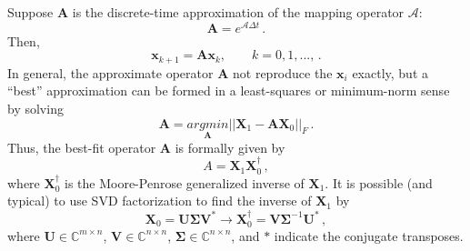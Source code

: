 Suppose $\mathbf{A}$ is the discrete-time approximation of the mapping operator $\mathcal{A}$:
\begin{equation}
\label{eq:A}
\mathbf{A} = e^{\mathcal{A} \Delta t} \, .
\end{equation}
Then,
\begin{equation}
\label{eq:x0x1}
\mathbf{x}_{k+1} = \mathbf{A} \mathbf{x}_{k}, \quad \quad k = 0,1,...,\, .
\end{equation}
In general, the approximate operator $\mathbf{A}$ not reproduce the $\mathbf{x}_i$ exactly, but a ``best'' approximation can be formed in a least-squares or minimum-norm sense by solving
\begin{equation}
\label{eq:least}
\mathbf{A} =  \underset{\mathbf{A}}{argmin} ||\mathbf{X}_1 - \mathbf{A} \mathbf{X}_0||_F \, .
\end{equation}
Thus, the best-fit operator $\mathbf{A}$ is formally given by 
\begin{equation}
\label{eq:fullA}
A = \mathbf{X}_1 \mathbf{X}_0^{\dagger} \, ,
\end{equation}
where $\mathbf{X}_0^{\dagger}$ is the Moore-Penrose generalized inverse of $\mathbf{X}_1$.
It is possible (and typical) to use SVD factorization to find the inverse of $\mathbf{X}_1$ by
\begin{equation}
\label{eq:svd}
\mathbf{X}_0 = \mathbf{U} \bm{\Sigma} \mathbf{V}^{*} \rightarrow \mathbf{X}_0^{\dagger} = \mathbf{V} \bm{\Sigma}^{-1} \mathbf{U}^* \, ,
\end{equation}
where $\mathbf{U} \in \mathbb{C}^{m\times n}$, $\mathbf{V} \in \mathbb{C}^{n\times n}$, $\bm{\Sigma} \in \mathbb{C}^{n\times n}$, and $*$ indicate the conjugate transposes. 

